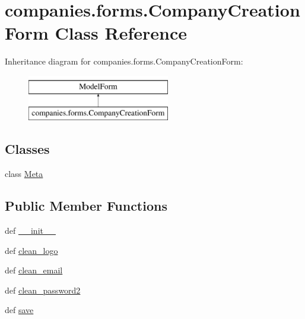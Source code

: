 \hypertarget{classcompanies_1_1forms_1_1_company_creation_form}{\section{companies.\-forms.\-Company\-Creation\-Form Class Reference}
\label{classcompanies_1_1forms_1_1_company_creation_form}
}
Inheritance diagram for companies.\-forms.\-Company\-Creation\-Form\-:\begin{figure}[H]
\begin{center}
\leavevmode
\includegraphics[height=2.000000cm]{classcompanies_1_1forms_1_1_company_creation_form}
\end{center}
\end{figure}
\subsection*{Classes}
\begin{DoxyCompactItemize}
\item 
class \hyperlink{classcompanies_1_1forms_1_1_company_creation_form_1_1_meta}{Meta}
\end{DoxyCompactItemize}
\subsection*{Public Member Functions}
\begin{DoxyCompactItemize}
\item 
def \hyperlink{classcompanies_1_1forms_1_1_company_creation_form_a128597d448c85bd620214e1c1bce412f}{\-\_\-\-\_\-init\-\_\-\-\_\-}
\item 
def \hyperlink{classcompanies_1_1forms_1_1_company_creation_form_a754fc172ebe134825990720e3aa5a00f}{clean\-\_\-logo}
\item 
def \hyperlink{classcompanies_1_1forms_1_1_company_creation_form_a4dec0a53d5fa4a916af2c33b3cf22604}{clean\-\_\-email}
\item 
def \hyperlink{classcompanies_1_1forms_1_1_company_creation_form_ab64574aa88d7c7ad1469e84714a9f764}{clean\-\_\-password2}
\item 
def \hyperlink{classcompanies_1_1forms_1_1_company_creation_form_af098403878d3a5c4c442e38723eb0abd}{save}
\end{DoxyCompactItemize}
